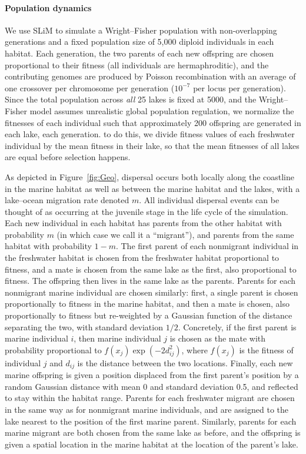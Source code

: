 \documentclass{article}
\begin{document}
\paragraph{Population dynamics}
We use SLiM to simulate a Wright--Fisher population with non-overlapping generations 
and a fixed population size of 5,000 diploid individuals in each habitat.
Each generation, the two parents of each new offspring are chosen proportional to their fitness 
(all individuals are hermaphroditic),
and the contributing genomes are produced by Poisson recombination 
with an average of one crossover per chromosome per generation 
($10^{-7}$ per locus per generation). 
Since the total population across \emph{all} 25 lakes is fixed at 5000,
and the Wright--Fisher model assumes unrealistic global population regulation,
we normalize the fitnesses of each individual such that approximately 200 offspring are generated in each lake, each generation.
to do this, we divide fitness values of each freshwater individual by the mean fitness in their lake, 
so that the mean fitnesses of all lakes are equal before selection happens.

As depicted in Figure~\ref{fig:Geo}, dispersal occurs both locally along the coastline in the marine habitat
as well as between the marine habitat and the lakes,
with a lake--ocean migration rate denoted $m$.
All individual dispersal events can be thought of as occurring at the juvenile stage in the life cycle of the simulation. 
Each new individual in each habitat 
has parents from the other habitat with probability $m$ 
(in which case we call it a ``migrant''),
and parents from the same habitat with probability $1-m$.
The first parent of each nonmigrant individual in the freshwater habitat
is chosen from the freshwater habitat proportional to fitness, 
and a mate is chosen from the same lake as the first, also proportional to fitness. 
The offspring then lives in the same lake as the parents.
Parents for each nonmigrant marine individual are chosen similarly:
first, a single parent is chosen proportionally to fitness in the marine habitat,
and then a mate is chosen, also proportionally to fitness but re-weighted by a Gaussian function of the distance separating the two, with standard deviation $1/2$. 
Concretely, if the first parent is marine individual $i$, 
then marine individual $j$ is chosen as the mate with probability proportional to $f(x_j) \exp(-2d_{ij}^2)$,
where $f(x_j)$ is the fitness of individual $j$ and $d_{ij}$ is the distance between the two locations. 
Finally, each new marine offspring is given a position displaced from the first parent's position by a random Gaussian distance with mean 0 and standard deviation 0.5, 
and reflected to stay within the habitat range.
Parents for each freshwater migrant are chosen in the same way
as for nonmigrant marine individuals,
and are assigned to the lake nearest to the position of the first marine parent.
Similarly, parents for each marine migrant are both chosen from the same lake as before,
and the offspring is given a spatial location in the marine habitat at the location of the parent's lake. 
\end{document}
